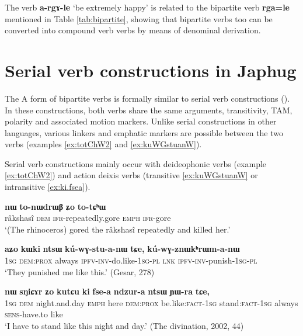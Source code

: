 \documentclass[oneside,a4paper,11pt]{article}
\newcommand{\ipa}[1]{{\phon\textbf{#1}}}
\newcommand{\jpg}[2]{\ipa{#1} `#2'}
\begin{document}
The verb \jpg{a-rgɤ-le}{be extremely happy} is related to the bipartite verb \ipa{rga=le} mentioned in Table \ref{tab:bipartite}, showing that bipartite verbs too can be converted into compound verb verbs by means of denominal derivation.

\section{Serial verb constructions in Japhug} \label{sec:serial}
The A form of bipartite verbs is formally similar to serial verb constructions (\citealt{sun12complementation, jacques13harmonization}). In these constructions, both verbs share the same arguments, transitivity, TAM, polarity and associated motion markers. Unlike serial constructions in other languages, various linkers and emphatic markers are possible between the two verbs (examples \ref{ex:totChW2} and \ref{ex:kuWGstuanW}).

Serial verb constructions mainly occur with deideophonic verbs (example \ref{ex:totChW2}) and action deixis verbs (transitive \ref{ex:kuWGstuanW} or intransitive \ref{ex:ki.fsea}).

\begin{exe}
\ex \label{ex:totChW2}
\gll 	\ipa{srɯnmɯ} 	\ipa{nɯ} 	\ipa{to-nɯdrɯβ} 	\ipa{ʑo} 	 	\ipa{to-tɕʰɯ} \\
 râkshasî \textsc{dem}  \textsc{ifr}-repeatedly.gore  \textsc{emph}  \textsc{ifr}-gore \\
 \glt `(The rhinoceros) gored the râkshasî repeatedly and killed her.' 
\end{exe}	

\begin{exe}
\ex \label{ex:kuWGstuanW}
\gll 	
 \ipa{aʑo} 	\ipa{kɯki} 	\ipa{ntsɯ} 	\ipa{kú-wɣ-stu-a-nɯ} 	\ipa{tɕe,} 	\ipa{kú-wɣ-znɯkʰrɯm-a-nɯ} \\
 \textsc{1sg} \textsc{dem:prox} always \textsc{ipfv-inv}-do.like-\textsc{1sg-pl} \textsc{lnk} \textsc{ipfv-inv}-punish-\textsc{1sg-pl} \\
 \glt `They punished me like this.' (Gesar, 278)
\end{exe}	

\begin{exe}
\ex \label{ex:ki.fsea}
\gll \ipa{aʑo} 	\ipa{nɯ} 	\ipa{sŋiɕɤr} 	\ipa{ʑo} 	\ipa{kutɕu} 	\ipa{ki} 	\ipa{fse-a} 	\ipa{ndzur-a} 	\ipa{ntsɯ} 	\ipa{ɲɯ-ra} 	\ipa{tɕe,} \\
\textsc{1sg} \textsc{dem} night.and.day \textsc{emph} here \textsc{dem:prox} be.like:\textsc{fact-1sg} stand:\textsc{fact-1sg} always \textsc{sens}-have.to like \\
\glt `I have to stand like this night and day.' (The divination, 2002, 44)
\end{exe}
\end{document}
